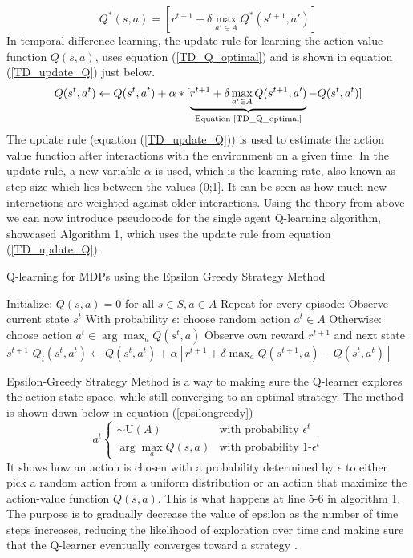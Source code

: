 \documentclass{article}
\begin{document}
\begin{equation}
    \label{TD_Q_optimal}
        Q^*(s,a)= [r^{t+1}+\delta \max_{a'\in A}Q^*(s^{t+1},a')]
\end{equation}
In temporal difference learning, the update rule for learning the action value function $Q(s,a)$, uses equation (\ref{TD_Q_optimal}) and is shown in equation (\ref{TD_update_Q}) just below. 
\begin{equation}
    \label{TD_update_Q}
    Q(s^t,a^t)\leftarrow Q(s^t,a^t)+\alpha *[\underbrace{ r^{t+1}+\delta \max_{a'\in A} Q(s^{t+1},a')}_{\text{Equation \ref{TD_Q_optimal}}}-Q(s^t,a^t)]
\end{equation}
The update rule (equation (\ref{TD_update_Q})) is used to estimate the action value function after interactions with the environment on a given time. 
In the update rule, a new variable $\alpha$ is used, which is the learning rate, also known as step size which lies between the values (0;1]. It can be seen as how much new interactions are weighted against older interactions. Using the theory from above we can now introduce pseudocode for the single agent Q-learning algorithm, showcased Algorithm 1, which uses the update rule from equation (\ref{TD_update_Q}).
\begin{algorithm}[H]
\caption{Q-learning for MDPs using the Epsilon Greedy Strategy Method}
\begin{algorithmic}[1]
\State Initialize: \( Q(s, a) = 0 \) for all \( s \in S, a \in A \)
\State Repeat for every episode:
    \State Observe current state \( s^t \)
    \State With probability \( \epsilon \): choose random action \( a^t \in A \)
    \State Otherwise: choose action \( a^t \in \arg \max_{a} Q(s^t, a) \)
    \State Observe own reward \( r^{t+1} \) and next state \( s^{t+1} \)
    \State \( Q_i(s^t, a^t) \gets Q(s^t, a^t) + \alpha [r^{t+1} + \delta \max_{a} Q(s^{t+1}, a) - Q(s^t, a^t)] \)
\EndFor
\end{algorithmic}
\end{algorithm}
Epsilon-Greedy Strategy Method is a way to making sure the Q-learner explores the action-state space, while still converging to an optimal strategy. The method is shown down below in equation (\ref{epsilongreedy}) 
\begin{equation}
    \label{epsilongreedy}
    a^t\begin{cases}
        \sim\text{U}(A)& \text{with probability $\epsilon^t$}\\
        \arg \max_a Q(s,a) & \text{with probability 1-$\epsilon^t$}
    \end{cases}
\end{equation}
It shows how an action is chosen with a probability determined by $\epsilon$ to either pick a random action from a uniform distribution or an action that maximize the action-value function $Q(s,a)$. This is what happens at line 5-6 in algorithm 1. 
The purpose is to gradually decrease the value of epsilon as the number of time steps increases, reducing the likelihood of exploration over time and making sure that the Q-learner eventually converges toward a strategy \citep[p. 32-35]{marl-book}.
\end{document}

